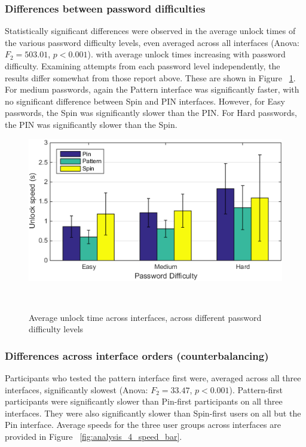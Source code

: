 \documentclass{sigchi}
\begin{document}
\subsubsection{Differences between password difficulties} 
Statistically significant differences were observed in the average unlock times of the various password difficulty levels, even averaged across all interfaces (Anova: $F_2=503.01$, $p < 0.001$).  %
with average unlock times increasing with password difficulty.  %
Examining attempts from each password level independently, the results differ somewhat from those report above. These are shown in Figure ~\ref{fig:analysis_3_speed_bar}. For medium passwords, again the Pattern interface was significantly faster, with no significant difference between Spin and PIN interfaces. However, for Easy passwords, the Spin was significantly slower than the PIN. For Hard passwords, the PIN was significantly slower than the Spin.

\begin{figure}[h]
  \centering
  \includegraphics[width=0.9\columnwidth]{figures/analysis_3_speed_bar.png}
  \caption{Average unlock time across interfaces, across different password difficulty levels}~\label{fig:analysis_3_speed_bar}
\end{figure}  


\subsubsection{Differences across interface orders (counterbalancing)}
 Participants who tested the pattern interface first were, averaged across all three interfaces, significantly slowest (Anova: $F_2=33.47$, $p < 0.001$). Pattern-first participants were significantly slower than Pin-first participants on all three interfaces. They were also significantly slower than Spin-first users on all but the Pin interface.  Average speeds for the three user groups across interfaces are provided in Figure ~\ref{fig:analysis_4_speed_bar}. \\
\end{document}
